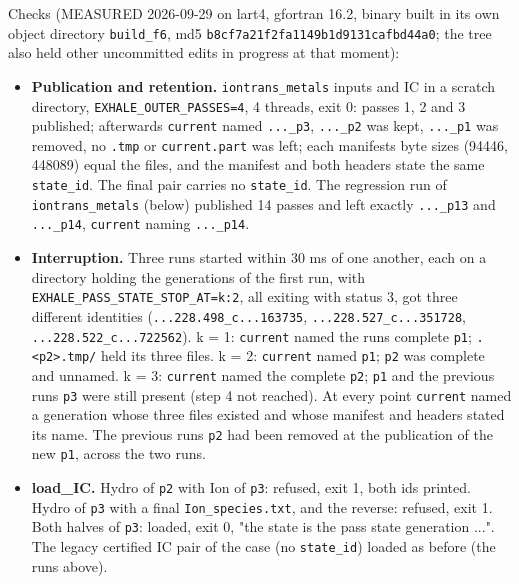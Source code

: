 \documentclass[english,a4paper]{my_memo}
\providecommand{\tightlist}{\setlength{\itemsep}{0pt}\setlength{\parskip}{0pt}}
\begin{document}
Checks (MEASURED 2026-09-29 on lart4, gfortran 16.2, binary built in its own
object directory \texttt{build\_f6}, md5 \texttt{b8cf7a21f2fa1149b1d9131cafbd44a0}; the
tree also held other uncommitted edits in progress at that moment):

\begin{itemize}
\tightlist
\item
  \textbf{Publication and retention.} \texttt{iontrans\_metals} inputs and IC in a
  scratch directory, \texttt{EXHALE\_OUTER\_PASSES=4}, 4 threads, exit 0: passes 1, 2
  and 3 published; afterwards \texttt{current} named \texttt{...\_p3}, \texttt{...\_p2} was kept,
  \texttt{...\_p1} was removed, no \texttt{.tmp} or \texttt{current.part} was left; each manifest\textquotesingle s
  byte sizes (94446, 448089) equal the files, and the manifest and both
  headers state the same \texttt{state\_id}. The final pair carries no \texttt{state\_id}.
  The regression run of \texttt{iontrans\_metals} (below) published 14 passes and
  left exactly \texttt{...\_p13} and \texttt{...\_p14}, \texttt{current} naming \texttt{...\_p14}.
\item
  \textbf{Interruption.} Three runs started within 30 ms of one another, each on a
  directory holding the generations of the first run, with
  \texttt{EXHALE\_PASS\_STATE\_STOP\_AT=k:2}, all exiting with status 3, got three
  different identities (\texttt{...228.498\_c...163735}, \texttt{...228.527\_c...351728},
  \texttt{...228.522\_c...722562}). k = 1: \texttt{current} named the run\textquotesingle s complete \texttt{p1};
  \texttt{.\textless{}p2\textgreater{}.tmp/} held its three files. k = 2: \texttt{current} named \texttt{p1}; \texttt{p2} was
  complete and unnamed. k = 3: \texttt{current} named the complete \texttt{p2}; \texttt{p1} and
  the previous run\textquotesingle s \texttt{p3} were still present (step 4 not reached). At every
  point \texttt{current} named a generation whose three files existed and whose
  manifest and headers stated its name. The previous run\textquotesingle s \texttt{p2} had been
  removed at the publication of the new \texttt{p1}, across the two runs.
\item
  \textbf{load\_IC.} Hydro of \texttt{p2} with Ion of \texttt{p3}: refused, exit 1, both ids
  printed. Hydro of \texttt{p3} with a final \texttt{Ion\_species.txt}, and the reverse:
  refused, exit 1. Both halves of \texttt{p3}: loaded, exit 0, "the state is the
  pass state generation ...". The legacy certified IC pair of the case
  (no \texttt{state\_id}) loaded as before (the runs above).

\end{itemize}
\end{document}
